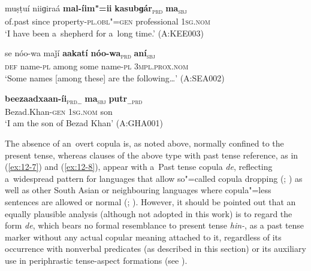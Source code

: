 \begin{exe}
\ex
\label{ex:12-4}
\gll muṣṭuí niiɡiraá {\ob}\textbf{mal-íim"=ii} \textbf{kasubɡár}{\cb}\textsubscript{\textsc{\upshape prd}} {\ob}\textbf{ma}{\cb}\textsubscript{\textsc{\upshape sbj}}\\
of.past since property-\textsc{pl.obl"=gen} professional \textsc{1sg.nom}  \\
\glt `I have been a~shepherd for a~long time.' (A:KEE003)
\end{exe}
\begin{exe}
\ex
\label{ex:12-5}
\gll se nóo-wa maǰí {\ob}\textbf{aakatí} \textbf{nóo-wa}{\cb}\textsubscript{\textsc{\upshape prd}} {\ob}\textbf{aní}{\cb}\textsubscript{\textsc{\upshape sbj}}\\
\textsc{def} name-\textsc{pl} among some name-\textsc{pl} 3\textsc{mpl.prox.nom} \\
\glt `Some names [among these] are the following{\ldots}' (A:SEA002)
\end{exe}
\begin{exe}
\ex
\label{ex:12-6}
\gll {\ob}\textbf{beezaadxaan-íi}{\cb}\textsubscript{\textsc{\upshape prd{\ldots}}} {\ob}\textbf{ma}{\cb}\textsubscript{\textsc{\upshape sbj}} {\ob}\textbf{putr}{\cb}\textsubscript{\textsc{{\ldots}\upshape prd}}\\
Bezad.Khan-\textsc{gen} \textsc{1sg.nom} son\\
\glt `I am the son of Bezad Khan' (A:GHA001)
\end{exe}

The absence of an~overt copula is, as noted above, normally confined to the present tense, whereas clauses of the above type with past tense reference, as in (\ref{ex:12-7}) and (\ref{ex:12-8}), appear with a~Past tense copula \textit{de}, reflecting a~widespread pattern for languages that allow so"=called copula dropping (\citealt[34]{pustet2003}; \citealt[120]{givon2001a}) as well as other South Asian or neighbouring languages where copula"=less sentences are allowed or normal (\citealt[339]{masica1991}; \citealt[121]{baart1999a}). However, it should be pointed out that an equally plausible analysis (although not adopted in this work) is to regard the form \textit{de}, which bears no formal resemblance to present tense \textit{hin-}, as a past tense marker without any actual copular meaning attached to it, regardless of its occurrence with nonverbal predicates (as described in this section) or its auxiliary use in periphrastic tense-aspect formations (see ). 

